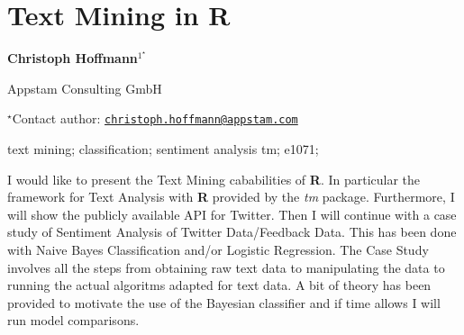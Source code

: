 \documentclass[\main/boa.tex]{subfiles}
\begin{document}
\section{Text Mining in R}

\begin{center}
  {\bf {} Christoph Hoffmann$^{1^\star}$}
\end{center}

\vskip 0.3cm

\begin{affiliations}
\begin{enumerate}
\begin{minipage}{0.915\textwidth}
\centering
\item Appstam Consulting GmbH \\[-2pt]
\end{minipage}
\end{enumerate}
$^\star$Contact author: \href{mailto:christoph.hoffmann@appstam.com}{\nolinkurl{christoph.hoffmann@appstam.com}}\\
\end{affiliations}

\vskip 0.5cm

\begin{minipage}{0.915\textwidth}
\keywords text mining; classification; sentiment analysis
\packages {} tm;  e1071; 
\end{minipage}

\vskip 0.8cm

I would like to present the Text Mining cababilities of \textbf{R}. In
particular the framework for Text Analysis with \textbf{R} provided by
the \emph{tm} package. Furthermore, I will show the publicly available
API for Twitter. Then I will continue with a case study of Sentiment
Analysis of Twitter Data/Feedback Data. This has been done with Naive
Bayes Classification and/or Logistic Regression. The Case Study involves
all the steps from obtaining raw text data to manipulating the data to
running the actual algoritms adapted for text data. A bit of theory has
been provided to motivate the use of the Bayesian classifier and if time
allows I will run model comparisons.
\end{document}
